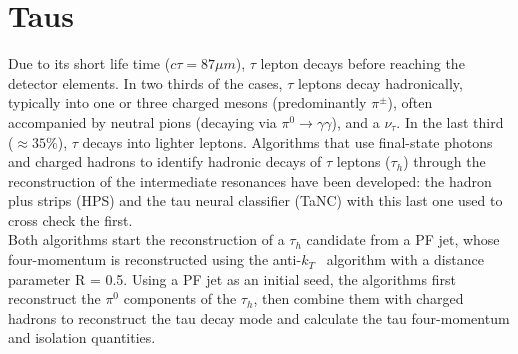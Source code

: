 \section{Taus}
Due to its short life time ($c\tau = 87 \mu m$), $\tau$ lepton decays before reaching the detector elements. In two thirds of the cases, $\tau$ leptons decay hadronically, typically into one or three charged mesons (predominantly $\pi^\pm$), often accompanied by neutral pions (decaying via $\pi^0 \to \gamma\gamma$), and a $\nu_\tau$. In the last third ($\approx 35\%$), $\tau$ decays into lighter leptons. Algorithms that use final-state photons and charged hadrons to identify hadronic decays of $\tau$ leptons ($\tau_h$) through the reconstruction of the intermediate resonances have been developed: the hadron plus strips (HPS) and the tau neural classifier (TaNC) with this last one used to cross check the first. \\
Both algorithms start the reconstruction of a $\tau_h$ candidate from a PF jet, whose four-momentum is reconstructed using the anti-$k_T$~\cite{Jet_Cacciari:2008gp, Jet_Cacciari:2011ma} algorithm with a distance parameter R = 0.5. Using a PF jet as an initial seed, the algorithms first reconstruct the $\pi^0$ components of the $\tau_h$, then combine them with charged hadrons to reconstruct the tau decay mode and calculate the tau four-momentum and isolation quantities.
